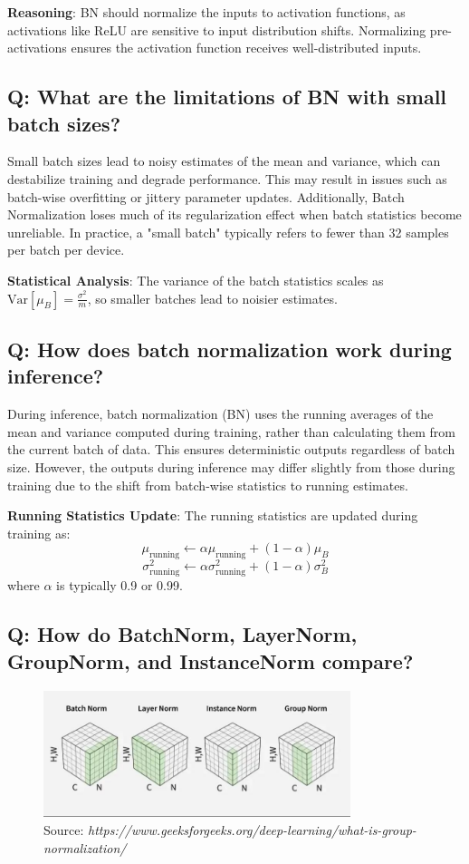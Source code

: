 \textbf{Reasoning}: BN should normalize the inputs to activation functions, as activations like ReLU are sensitive to input distribution shifts. Normalizing pre-activations ensures the activation function receives well-distributed inputs.

\subsection*{\textcolor{primaryteal}{Q: What are the limitations of BN with small batch sizes?}}
Small batch sizes lead to noisy estimates of the mean and variance, which can destabilize training and degrade performance. This may result in issues such as batch-wise overfitting or jittery parameter updates. Additionally, Batch Normalization loses much of its regularization effect when batch statistics become unreliable. In practice, a "small batch" typically refers to fewer than 32 samples per batch per device.

\textbf{Statistical Analysis}: The variance of the batch statistics scales as $\text{Var}[\mu_B] = \frac{\sigma^2}{m}$, so smaller batches lead to noisier estimates.

\subsection*{\textcolor{primaryteal}{Q: How does batch normalization work during inference?}}
During inference, batch normalization (BN) uses the running averages of the mean and variance computed during training, rather than calculating them from the current batch of data. This ensures deterministic outputs regardless of batch size. However, the outputs during inference may differ slightly from those during training due to the shift from batch-wise statistics to running estimates.

\textbf{Running Statistics Update}: The running statistics are updated during training as:
\[
	\mu_{\text{running}} \leftarrow \alpha \mu_{\text{running}} + (1-\alpha) \mu_B
\]
\[
	\sigma^2_{\text{running}} \leftarrow \alpha \sigma^2_{\text{running}} + (1-\alpha) \sigma^2_B
\]
where $\alpha$ is typically 0.9 or 0.99.

\subsection*{\textcolor{primaryteal}{Q: How do BatchNorm, LayerNorm, GroupNorm, and InstanceNorm compare?}}
\begin{figure}[H]
	\centering
	\includegraphics[width=0.8\textwidth]{images/norms.jpg}
	\caption{Source: \textit{https://www.geeksforgeeks.org/deep-learning/what-is-group-normalization/}}
\end{figure}

